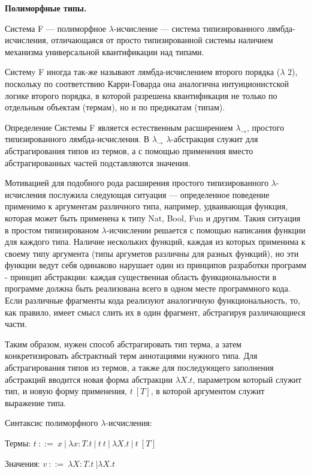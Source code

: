 \textbf{Полиморфные типы.}

Система F ---  полиморфное $\lambda$-исчисление ---  
система типизированного лямбда-исчисления, отличающаяся от просто 
типизированной системы наличием механизма универсальной квантификации над 
типами\cite{pirs}.

Системy F иногда так-же называют лямбда-исчислением второго порядка ($\lambda$
2), поскольку по соответствию Карри-Говарда она аналогична интуиционистской 
логике второго порядка, в которой разрешена квантификация не только по 
отдельным объектам (термам), но и по предикатам (типам)\cite{pirs}.

Определение Системы F является естественным расширением $\lambda_{\rightarrow
}$, простого типизированного лямбда-исчисления. В $\lambda_{\rightarrow}$ $
\lambda$-абстракция служит для абстрагирования типов из термов, а с помощью
применения вместо абстрагированных частей подставляются значения.

Мотивацией для подобного рода расширения простого типизированного $\lambda$-
исчисления послужила следующая ситуация --- определенное поведение применимо 
к аргументам различного типа, например, удваивающая функция, которая может 
быть применена к типу Nat, Bool, Fun и другим. Такия ситуация в простом 
типизированом $\lambda$-исчислении решается с помощью написания функции для 
каждого типа. Наличие нескольких функций, каждая из которых применима к 
своему типу аргумента (типы аргуметов различны 
для разных функций), но эти функции ведут себя одинаково нарушает один 
из принципов разработки программ - принцип абстракции\cite{pirs}: каждая 
существенная область функциональности в программе должна быть реализована 
всего в одном месте программного кода. Если различные фрагменты кода 
реализуют аналогичную функциональность, то, как правило, имеет
смысл слить их в один фрагмент, абстрагируя различающиеся части.

Таким образом,  нужен способ абстрагировать тип терма, а затем 
конкретизировать абстрактный терм аннотациями нужного типа. Для 
абстрагирования типов из термов, а также для последующего заполнения 
абстракций вводится новая форма абстракции $\lambda X.t$, параметром который 
служит тип, и новую форму применения, $t \ [T]$, в которой аргументом служит 
выражение типа\cite{girard}. 

Синтаксис полиморфного $\lambda$-исчисления:

Термы: $t \ ::= \ x \ | \ \lambda x: T.t \ | \ t \ t \ | \ \lambda X.t \ | \ t \ [T]$

Значения: $v \ ::= \ \lambda X:T.t \ | \lambda X.t$

